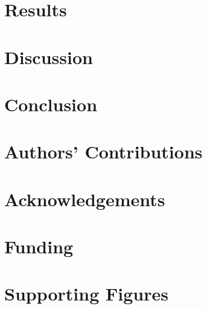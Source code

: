\section{Results}

\section{Discussion}

\section{Conclusion}

\section{Authors' Contributions}

\section{Acknowledgements}

\section{Funding}


\section{Supporting Figures}











